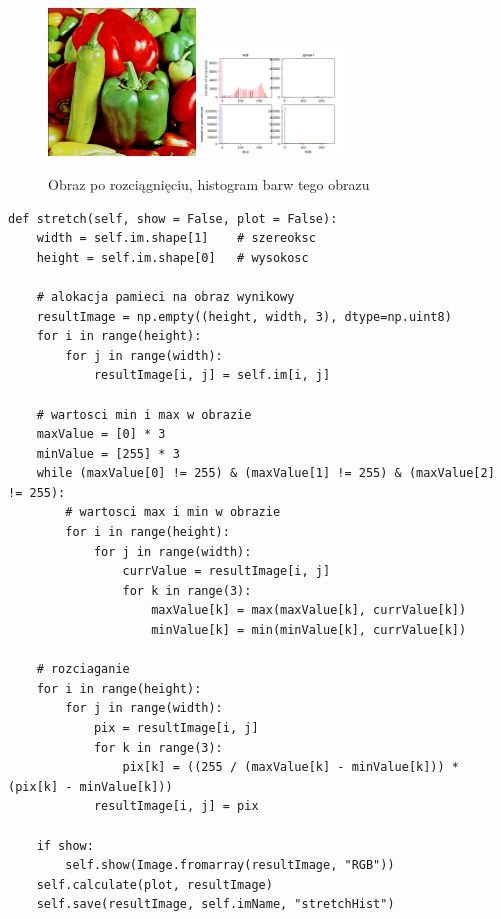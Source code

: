 \documentclass[final,a4paper,openany,12pt]{mwbk}
\begin{document}
\begin{figure}[H]
	\begin{center}
		\includegraphics[width=0.35\textwidth]{peppers_color_stretchHist_result}
		\includegraphics[width=0.35\textwidth]{peppers_color_stretchHist_histogram}
	\end{center}
	\caption{Obraz po rozciągnięciu, histogram barw tego obrazu}
\end{figure}


\begin{lstlisting}[caption=Rozciąganie histogramu]
def stretch(self, show = False, plot = False):
	width = self.im.shape[1]    # szereoksc
	height = self.im.shape[0]   # wysokosc
	
	# alokacja pamieci na obraz wynikowy
	resultImage = np.empty((height, width, 3), dtype=np.uint8)
	for i in range(height):
		for j in range(width):
			resultImage[i, j] = self.im[i, j]
	
	# wartosci min i max w obrazie
	maxValue = [0] * 3
	minValue = [255] * 3
	while (maxValue[0] != 255) & (maxValue[1] != 255) & (maxValue[2] != 255):
		# wartosci max i min w obrazie
		for i in range(height):
			for j in range(width):
				currValue = resultImage[i, j]
				for k in range(3):
					maxValue[k] = max(maxValue[k], currValue[k])
					minValue[k] = min(minValue[k], currValue[k])
	
	# rozciaganie
	for i in range(height):
		for j in range(width):
			pix = resultImage[i, j]
			for k in range(3):
				pix[k] = ((255 / (maxValue[k] - minValue[k])) * (pix[k] - minValue[k]))
			resultImage[i, j] = pix
	
	if show:
		self.show(Image.fromarray(resultImage, "RGB"))
	self.calculate(plot, resultImage)
	self.save(resultImage, self.imName, "stretchHist")
\end{lstlisting}
\end{document}
